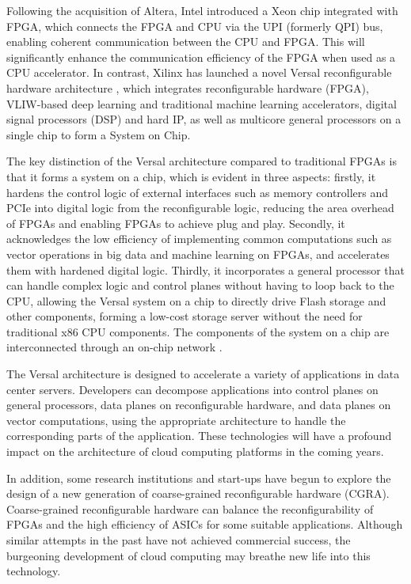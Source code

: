 Following the acquisition of Altera, Intel introduced a Xeon chip integrated with FPGA, which connects the FPGA and CPU via the UPI (formerly QPI) bus, enabling coherent communication between the CPU and FPGA. This will significantly enhance the communication efficiency of the FPGA when used as a CPU accelerator. In contrast, Xilinx has launched a novel Versal reconfigurable hardware architecture \cite{vissers2018keynote,vissers2019versal,gaide2019xilinx}, which integrates reconfigurable hardware (FPGA), VLIW-based deep learning and traditional machine learning accelerators, digital signal processors (DSP) and hard IP, as well as multicore general processors on a single chip to form a System on Chip. 

The key distinction of the Versal architecture compared to traditional FPGAs is that it forms a system on a chip, which is evident in three aspects: firstly, it hardens the control logic of external interfaces such as memory controllers and PCIe into digital logic from the reconfigurable logic, reducing the area overhead of FPGAs and enabling FPGAs to achieve plug and play. Secondly, it acknowledges the low efficiency of implementing common computations such as vector operations in big data and machine learning on FPGAs, and accelerates them with hardened digital logic. Thirdly, it incorporates a general processor that can handle complex logic and control planes without having to loop back to the CPU, allowing the Versal system on a chip to directly drive Flash storage and other components, forming a low-cost storage server without the need for traditional x86 CPU components. The components of the system on a chip are interconnected through an on-chip network \cite{swarbrick2019network,gaide2019xilinx}. 

The Versal architecture is designed to accelerate a variety of applications in data center servers. Developers can decompose applications into control planes on general processors, data planes on reconfigurable hardware, and data planes on vector computations, using the appropriate architecture to handle the corresponding parts of the application. These technologies will have a profound impact on the architecture of cloud computing platforms in the coming years. 

In addition, some research institutions and start-ups have begun to explore the design of a new generation of coarse-grained reconfigurable hardware (CGRA). Coarse-grained reconfigurable hardware can balance the reconfigurability of FPGAs and the high efficiency of ASICs for some suitable applications. Although similar attempts in the past have not achieved commercial success, the burgeoning development of cloud computing may breathe new life into this technology.

